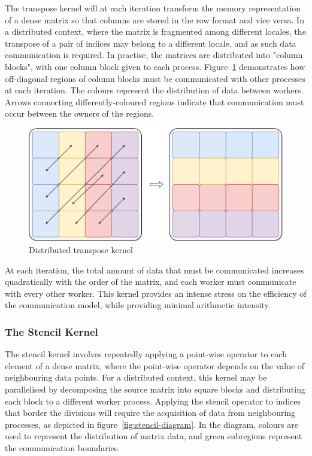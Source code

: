 \documentclass{juliacon}
\begin{document}
The transpose kernel will at each iteration transform the memory
representation of a dense matrix so that columns are stored in the row
format and vice versa. In a distributed context, where the matrix is
fragmented among different locales, the transpose of a pair of indices
may belong to a different locale, and as such data communication is
required. In practise, the matrices are distributed into "column
blocks", with one column block given to each process. Figure~\ref{fig:transpose-diagram} demonstrates how off-diagonal regions of
column blocks must be communicated with other processes at each
iteration. The colours represent the distribution of data between workers.
Arrows connecting differently-coloured regions indicate that communication must occur between the owners of the regions.

\begin{figure}[htb]
	\includegraphics[width=\linewidth]{figs/Transpose.pdf}
	\caption{Distributed transpose kernel}
	\label{fig:transpose-diagram}
\end{figure}

At each iteration, the total amount of data that must be communicated
increases quadratically with the order of the matrix, and each worker
must communicate with every other worker. This kernel provides an
intense stress on the efficiency of the communication model, while
providing minimal arithmetic intensity.

\subsubsection{The Stencil Kernel}

The stencil kernel involves repeatedly applying a point-wise operator to
each element of a dense matrix, where the point-wise operator depends on
the value of neighbouring data points. For a distributed context, this
kernel may be parallelised by decomposing the source matrix into square
blocks and distributing each block to a different worker process.
Applying the stencil operator to indices that border the divisions will
require the acquisition of data from neighbouring processes, as depicted
in figure~\ref{fig:stencil-diagram}. In the diagram, colours are used to represent the distribution of matrix data, and green subregions represent the communication boundaries.
\end{document}
